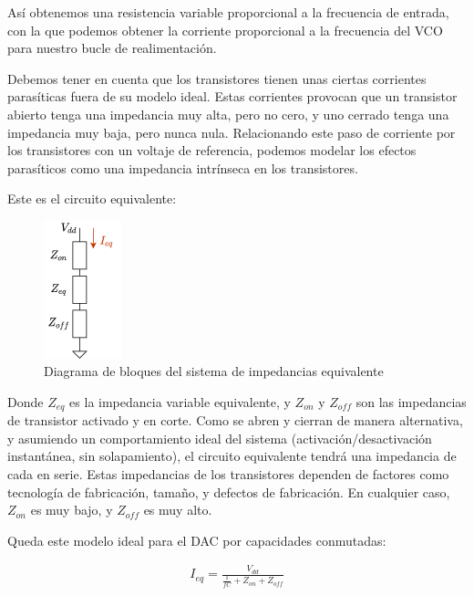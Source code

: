\documentclass[12pt]{report} %
\begin{document}
	Así obtenemos una resistencia variable proporcional a la frecuencia de entrada, con la que podemos obtener la corriente proporcional a la frecuencia del VCO para nuestro bucle de realimentación.
	
	Debemos tener en cuenta que los transistores tienen unas ciertas corrientes parasíticas fuera de su modelo ideal. Estas corrientes provocan que un transistor abierto tenga una impedancia muy alta, pero no cero, y uno cerrado tenga una impedancia muy baja, pero nunca nula. Relacionando este paso de corriente por los transistores con un voltaje de referencia, podemos modelar los efectos parasíticos como una impedancia intrínseca en los transistores.
	
	Este es el circuito equivalente:
	\begin{figure}[H]
		\includegraphics[width=0.2\textwidth]{sw-capacities-var-res-block.png}
		\caption[Diagrama de bloques del sistema de impedancias equivalente]{Diagrama de bloques del sistema de impedancias equivalente}
		\label{fig:sw-capacities-var-res-block.png}
	\end{figure}
	
	Donde $Z_{eq}$ es la impedancia variable equivalente, y $Z_{on}$ y $Z_{off}$ son las impedancias de transistor activado y en corte. Como se abren y cierran de manera alternativa, y asumiendo un comportamiento ideal del sistema (activación/desactivación instantánea, sin solapamiento), el circuito equivalente tendrá una impedancia de cada en serie. Estas impedancias de los transistores dependen de factores como tecnología de fabricación, tamaño, y defectos de fabricación. En cualquier caso, $Z_{on}$ es muy bajo, y $Z_{off}$ es muy alto.
	
	Queda este modelo ideal para el DAC por capacidades conmutadas:
	
	\begin{figure}[H]
		\label{sw-capacities-i_eq}
		\begin{equation}
		\begin{array}{c}
		I_{eq} = \frac{V_{dd}}{\frac{1}{fC} + Z_{on} + Z_{off}} \\
		\end{array}
		\end{equation}
	\end{figure}
	
\end{document}
